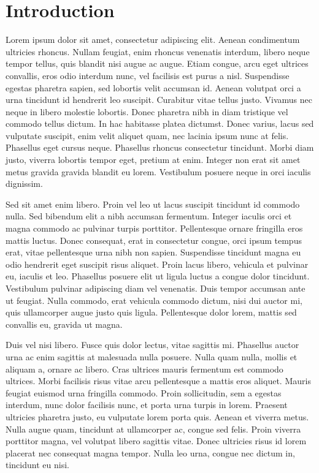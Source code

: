 \chapter{Introduction}
\ifpdf
    \graphicspath{{Introduction/IntroductionFigs/PNG/}{Introduction/IntroductionFigs/PDF/}{Introduction/IntroductionFigs/}}
\else
    \graphicspath{{Introduction/IntroductionFigs/EPS/}{Introduction/IntroductionFigs/}}
\fi
{}

Lorem ipsum dolor sit amet, consectetur adipiscing elit. Aenean condimentum ultricies rhoncus. Nullam feugiat, enim rhoncus venenatis interdum, libero neque tempor tellus, quis blandit nisi augue ac augue. Etiam congue, arcu eget ultrices convallis, eros odio interdum nunc, vel facilisis est purus a nisl. Suspendisse egestas pharetra sapien, sed lobortis velit accumsan id. Aenean volutpat orci a urna tincidunt id hendrerit leo suscipit. Curabitur vitae tellus justo. Vivamus nec neque in libero molestie lobortis. Donec pharetra nibh in diam tristique vel commodo tellus dictum. In hac habitasse platea dictumst. Donec varius, lacus sed vulputate suscipit, enim velit aliquet quam, nec lacinia ipsum nunc at felis. Phasellus eget cursus neque. Phasellus rhoncus consectetur tincidunt. Morbi diam justo, viverra lobortis tempor eget, pretium at enim. Integer non erat sit amet metus gravida gravida blandit eu lorem. Vestibulum posuere neque in orci iaculis dignissim.

Sed sit amet enim libero. Proin vel leo ut lacus suscipit tincidunt id commodo nulla. Sed bibendum elit a nibh accumsan fermentum. Integer iaculis orci et magna commodo ac pulvinar turpis porttitor. Pellentesque ornare fringilla eros mattis luctus. Donec consequat, erat in consectetur congue, orci ipsum tempus erat, vitae pellentesque urna nibh non sapien. Suspendisse tincidunt magna eu odio hendrerit eget suscipit risus aliquet. Proin lacus libero, vehicula et pulvinar eu, iaculis et leo. Phasellus posuere elit ut ligula luctus a congue dolor tincidunt. Vestibulum pulvinar adipiscing diam vel venenatis. Duis tempor accumsan ante ut feugiat. Nulla commodo, erat vehicula commodo dictum, nisi dui auctor mi, quis ullamcorper augue justo quis ligula. Pellentesque dolor lorem, mattis sed convallis eu, gravida ut magna.

Duis vel nisi libero. Fusce quis dolor lectus, vitae sagittis mi. Phasellus auctor urna ac enim sagittis at malesuada nulla posuere. Nulla quam nulla, mollis et aliquam a, ornare ac libero. Cras ultrices mauris fermentum est commodo ultrices. Morbi facilisis risus vitae arcu pellentesque a mattis eros aliquet. Mauris feugiat euismod urna fringilla commodo. Proin sollicitudin, sem a egestas interdum, nunc dolor facilisis nunc, et porta urna turpis in lorem. Praesent ultricies pharetra justo, eu vulputate lorem porta quis. Aenean et viverra metus. Nulla augue quam, tincidunt at ullamcorper ac, congue sed felis. Proin viverra porttitor magna, vel volutpat libero sagittis vitae. Donec ultricies risus id lorem placerat nec consequat magna tempor. Nulla leo urna, congue nec dictum in, tincidunt eu nisi.

